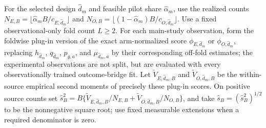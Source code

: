 For the selected design \(\widehat d_m\) and feasible pilot share \(\widehat\alpha_m\), use the realized counts \(N_{E,B}=\lfloor\widehat\alpha_mB/c_{E,\widehat d_m}\rfloor\) and \(N_{O,B}=\lfloor(1-\widehat\alpha_m)B/c_{O,\widehat d_m}\rfloor\).  Use a fixed observational-only fold count \(L\ge2\).  For each main-study observation, form the foldwise plug-in version of the exact arm-normalized score \(\phi_{E,\widehat d_m}\) or \(\phi_{O,\widehat d_m}\), replacing \(h_{\widehat d_m}\), \(q_{\widehat d_m}\), \(p_{g,a}\), and \(\mu_{\widehat d_m,a}\) by their corresponding off-fold estimates; the experimental observations are not split, but are evaluated with every observationally trained outcome-bridge fit.  Let \(\widetilde V_{E,\widehat d_m,B}\) and \(\widetilde V_{O,\widehat d_m,B}\) be the within-source empirical second moments of precisely these plug-in scores.  On positive source counts set \(\widehat s_B^2=B\{\widetilde V_{E,\widehat d_m,B}/N_{E,B}+\widetilde V_{O,\widehat d_m,B}/N_{O,B}\}\), and take \(\widehat s_B=(\widehat s_B^2)^{1/2}\) to be the nonnegative square root; use fixed measurable extensions when a required denominator is zero.